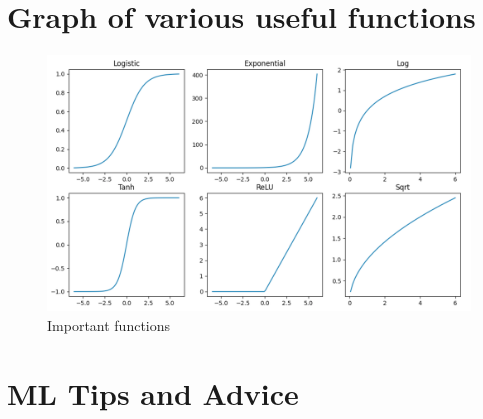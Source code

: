 \documentclass[../main.tex]{subfiles}
\begin{document}
\section{Graph of various useful functions}
\begin{figure}[h]
  \caption{Important functions}
  \centering
  \includegraphics[width=1\textwidth]{../imgs/functions.png}
\end{figure}

\section{ML Tips and Advice}
\end{document}
